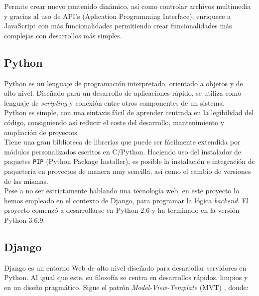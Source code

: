 \documentclass[a4paper, 12pt]{book}
\begin{document}
		Permite crear nuevo contenido dinámico, así como controlar archivos multimedia y gracias al uso de API's (Aplication Programming Interface), enriquece a JavaScript con más funcionalidades permitiendo crear funcionalidades más complejas con desarrollos más simples.
		
	\subsection{Python}
	\label{subsec:python}
		Python es un lenguaje de programación interpretado, orientado a objetos y de alto nivel. Diseñado para un desarrollo de aplicaciones rápido, se utiliza como lenguaje de \textit{scripting} y conexión entre otros componentes de un sistema.\\
		
		Python es simple, con una sintaxis fácil de aprender centrada en la legibilidad del código, consiguiendo así reducir el coste del desarrollo, mantenimiento y ampliación de proyectos.\\
		
		Tiene una gran biblioteca de librerías que puede ser fácilmente extendida por módulos personalizados escritos en C/Python. Haciendo uso del instalador de paquetes \texttt{PIP} (Python Package Installer), es posible la instalación e integración de paquetería en proyectos de manera muy sencilla, así como el cambio de versiones de las mismas.\\
		
		Pese a no ser estrictamente hablando una tecnología web, en este proyecto lo hemos empleado en el contexto de Django, para programar la lógica \textit{backend}. El proyecto comenzó a desarrollarse en Python 2.6 y ha terminado en la versión Python 3.6.9.
		
	\subsection{Django}
	\label{subsec:django}
		Django es un entorno Web de alto nivel diseñado para desarrollar servidores en Python. Al igual que este, su filosofía se centra en desarrollos rápidos, limpios y en un diseño pragmático. Sigue el patrón \textit{Model-View-Template} (MVT) \cite{Django MVC}, donde:
		
\end{document}
